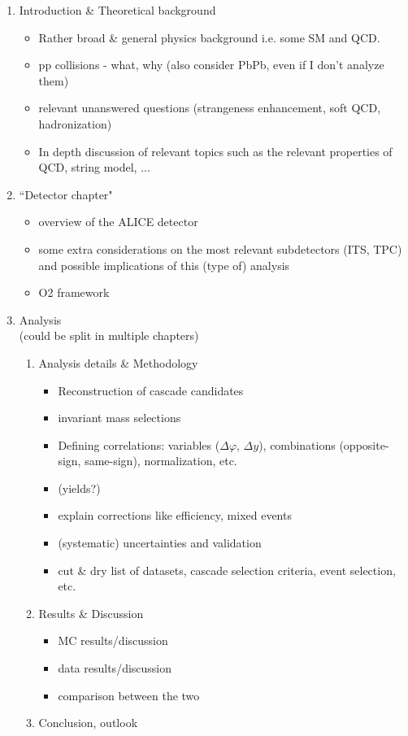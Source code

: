\begin{enumerate}
    \item Introduction \& Theoretical background
    \begin{itemize}
        \item Rather broad \& general physics background i.e. some SM and QCD.
        \item pp collisions - what, why (also consider PbPb, even if I don't analyze them)
        \item relevant unanswered questions (strangeness enhancement, soft QCD, hadronization) \\
        
        \item In depth discussion of relevant topics such as the relevant properties of QCD, string model, ...
    \end{itemize}

    \item ``Detector chapter"
    \begin{itemize}
        \item overview of the ALICE detector
        \item some extra considerations on the most relevant subdetectors (ITS, TPC) and possible implications of this (type of) analysis
        \item O2 framework
    \end{itemize}

    \item Analysis\\
    (could be split in multiple chapters)
    \begin{enumerate}
        \item Analysis details \& Methodology
        \begin{itemize}
            \item Reconstruction of cascade candidates
            \item invariant mass selections
            \item Defining correlations: variables ($\Delta\varphi$, $\Delta y$), combinations (opposite-sign, same-sign), normalization, etc. 
            \item (yields?)
            \item explain corrections like efficiency, mixed events
            \item (systematic) uncertainties and validation
            \item cut \& dry list of datasets, cascade selection criteria, event selection, etc.
        \end{itemize}

        \item Results \& Discussion
        \begin{itemize}
            \item MC results/discussion
            \item data results/discussion
            \item comparison between the two
        \end{itemize}

        \item Conclusion, outlook
    \end{enumerate}
    
\end{enumerate}